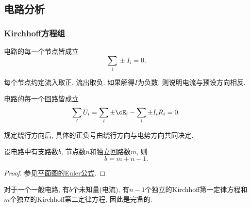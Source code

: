 \documentclass[../Electromagnetism.tex]{subfiles}
\begin{document}


\subsection{电路分析} %
\label{sub:电路分析}

\subsubsection{Kirchhoff方程组} %
\label{ssub:kirchhoff方程组}

\begin{finale}
	\begin{corollary}[Kirchhoff第一定律]
		电路的每一个节点皆成立
		\[ \sum_i \pm I_i = 0. \]
	\end{corollary}
\end{finale}
\begin{remark}
	每个节点约定流入取正, 流出取负. 如果解得$I$为负数, 则说明电流与预设方向相反.
\end{remark}
\begin{finale}
	\begin{corollary}[Kirchhoff第二定律]
		电路的每一个回路皆成立
		\[ \sum_i U_i = \sum_i \pm\cE_i - \sum_i \pm I_i R_i = 0. \]
	\end{corollary}
\end{finale}
\begin{remark}
	规定绕行方向后, 具体的正负号由绕行方向与电势方向共同决定.
\end{remark}
\begin{theorem}[电路的Euler公式]
	设电路中有支路数$b$, 节点数$n$和独立回路数$m$, 则
	\[ b = m + n - 1. \]
\end{theorem}
\begin{proof}
	参见\href{https://en.wikipedia.org/wiki/Planar_graph#Euler's_formula}{平面图的Euler公式}.
\end{proof}
对于一个一般电路, 有$b$个未知量(电流), 有$n-1$个独立的Kirchhoff第一定律方程和$m$个独立的Kirchhoff第二定律方程, 因此是完备的.
\end{document}
